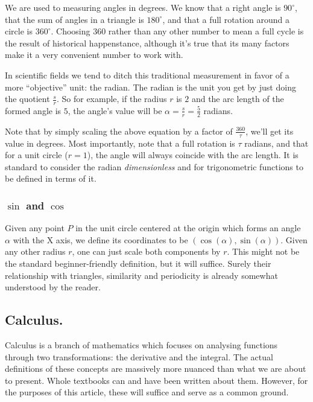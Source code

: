 We are used to measuring angles in degrees. We know that a right angle is $90^{\circ}$, that the sum of angles in a triangle is $180^{\circ}$, and that a full rotation around a circle is $360^{\circ}$. Choosing 360 rather than any other number to mean a full cycle is the result of historical happenstance, although it's true that its many factors make it a very convenient number to work with.

In scientific fields we tend to ditch this traditional measurement in favor of a more \enquote{objective} unit: the radian. The radian is the unit you get by just doing the quotient $\frac{s}{r}$. So for example, if the radius $r$ is $2$ and the arc length of the formed angle is $5$, the angle's value will be $\alpha = \frac{s}{r} = \frac{5}{2}$ radians.

Note that by simply scaling the above equation by a factor of $\frac{360}{\tau}$, we'll get its value in degrees. Most importantly, note that a full rotation is $\tau$ radians, and that for a unit circle ($r = 1$), the angle will always coincide with the arc length. It is standard to consider the radian \textit{dimensionless} and for trigonometric functions to be defined in terms of it.

\newpage

\subsubsection{$\sin$ and $\cos$}

Given any point $P$ in the unit circle centered at the origin which forms an angle $\alpha$ with the X axis, we define its coordinates to be $(\cos(\alpha), \sin(\alpha))$. Given any other radius $r$, one can just scale both components by $r$. This might not be the standard beginner-friendly definition, but it will suffice. Surely their relationship with triangles, similarity and periodicity is already somewhat understood by the reader.

\subsection{Calculus.}

Calculus is a branch of mathematics which focuses on analysing functions through two transformations: the derivative and the integral. The actual definitions of these concepts are massively more nuanced than what we are about to present. Whole textbooks can and have been written about them. However, for the purposes of this article, these will suffice and serve as a common ground.

